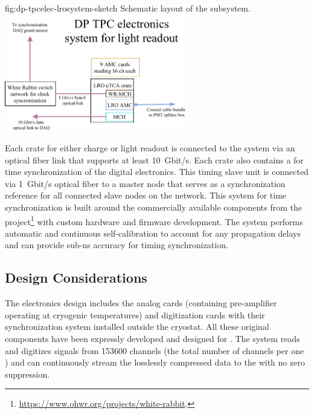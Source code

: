 \begin{dunefigure}{fig:dp-tpcelec-lrosystem-sketch}
{Schematic layout of the   subsystem.}
\includegraphics[width=0.6\textwidth]{graphics/dp-tpcelec-lrosystem-sketch}
\end{dunefigure}

Each  crate for either charge or light readout is connected to the  system via an optical fiber link that supports at least \SI{10}{Gbit/s}. Each crate also contains a  for time synchronization of the digital electronics. This timing slave unit is connected via \SI{1}{Gbit/s} optical fiber to a master node that serves as a synchronization reference for all connected slave nodes on the network. This system for time synchronization is built around the commercially available components from the  project\footnote{\url{https://www.ohwr.org/projects/white-rabbit}.} with custom hardware and firmware development. The system performs automatic and continuous self-calibration to account for any propagation delays and can provide sub-\si{\nano\s} accuracy for timing synchronization.



\subsection{Design Considerations}
\label{ssec:dp-tpcelec-requir}


The  electronics design includes the analog  cards (containing pre-amplifier  operating at cryogenic temperatures) and digitization cards with their synchronization system installed outside the cryostat. All these original components have been expressly developed and designed for . The system reads and digitizes signals from \num{153600} channels (the total number of  channels per one ) and can continuously stream the losslessly compressed data to the  with no zero suppression. 

